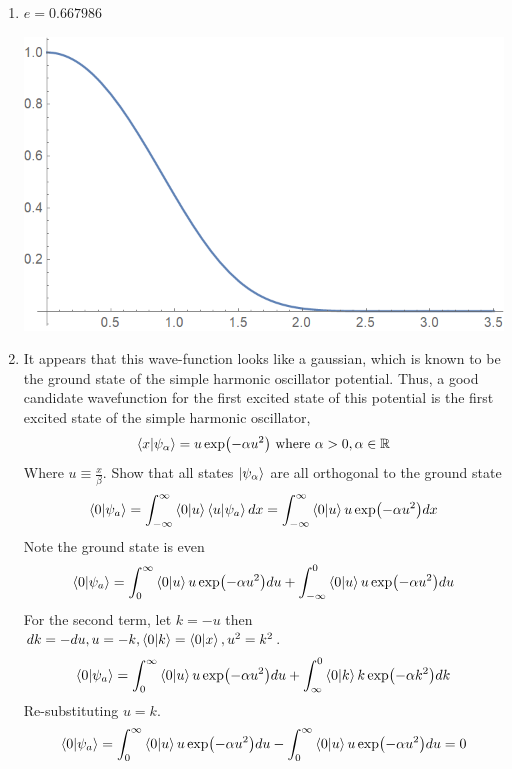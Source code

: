 \begin{sol}
\begin{enumerate}[label=\textbf{(\alph*)}]
\item
$e=0.667986$ \\
\begin{center}
\includegraphics[scale=0.4]{P02/HO4.png}
\end{center}
\item
It appears that this wave-function looks like a gaussian, which is known to be the ground state of the simple harmonic oscillator potential. Thus, a good candidate wavefunction for the first excited state of this potential is the first excited state of the simple harmonic oscillator, 
\begin{equation}
	\braket{x}{\psi_\alpha}=u\exp(-\alpha u^2)\text{ where }\alpha>0, \alpha\in\mathbb R
\end{equation} 
Where $u\equiv\frac{x}{\beta}$. Show that all states $\ket{\psi_\alpha}$ are all orthogonal to the ground state
\begin{equation}
	\braket{0}{\psi_a}=\int_{-\infty}^\infty\braket{0}{u}\braket{u}{\psi_a}dx=\int_{-\infty}^\infty\braket{0}{u}u\exp(-\alpha u^2)dx
\end{equation} 
Note the ground state is even
\begin{equation}
	\braket{0}{\psi_a}=\int_0^\infty\braket{0}{u}u\exp(-\alpha u^2)du+\int_{-\infty}^0\braket{0}{u}u\exp(-\alpha u^2)du
\end{equation}
For the second term, let $k=-u$ then $dk=-du,u=-k,\braket{0}{k}=\braket{0}{x}, u^2=k^2$.
\begin{equation}
	\braket{0}{\psi_a}=\int_0^\infty\braket{0}{u}u\exp(-\alpha u^2)du+\int_{\infty}^0\braket{0}{k}k\exp(-\alpha k^2)dk
\end{equation} 
Re-substituting $u=k$.
\begin{equation}
	\braket{0}{\psi_a}=\int_0^\infty\braket{0}{u}u\exp(-\alpha u^2)du-\int_{0}^\infty\braket{0}{u}u\exp(-\alpha u^2)du=0

\end{equation}
\end{enumerate}
\end{sol}
